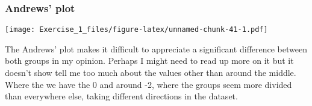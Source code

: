 \documentclass[]{article}
\newenvironment{Shaded}{\begin{snugshade}}{\end{snugshade}}
\newcommand{\DataTypeTok}[1]{\textcolor[rgb]{0.13,0.29,0.53}{#1}}
\newcommand{\DecValTok}[1]{\textcolor[rgb]{0.00,0.00,0.81}{#1}}
\newcommand{\KeywordTok}[1]{\textcolor[rgb]{0.13,0.29,0.53}{\textbf{#1}}}
\newcommand{\NormalTok}[1]{#1}
\newcommand{\OperatorTok}[1]{\textcolor[rgb]{0.81,0.36,0.00}{\textbf{#1}}}
\begin{document}
\hypertarget{andrews-plot}{%
\subsubsection{Andrews' plot}\label{andrews-plot}}

\begin{Shaded}
\end{Shaded}

\texttt{[image: Exercise\_1\_files/figure-latex/unnamed-chunk-41-1.pdf]}

The Andrews' plot makes it difficult to appreciate a significant
difference between both groups in my opinion. Perhaps I might need to
read up more on it but it doesn't show tell me too much about the values
other than around the middle. Where the we have the 0 and around -2,
where the groups seem more divided than everywhere else, taking
different directions in the dataset.
\end{document}

